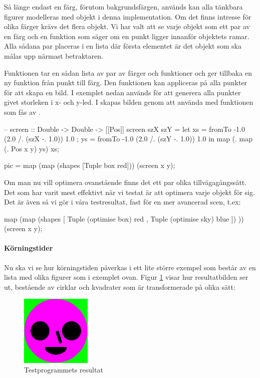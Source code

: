 \documentclass[Rapport]{subfiles}
\begin{document}
Så länge endast en färg, förutom bakgrundsfärgen, används kan alla tänkbara figurer modelleras
med objekt i denna implementation. Om det finns intresse för olika färger krävs det
flera objekt. Vi har valt att se varje objekt som ett par
av en färg och en funktion som säger om en punkt ligger innanför objektets ramar. 
Alla sådana par placeras i en lista där första elementet är det
objekt som ska målas upp närmast betraktaren. 

Funktionen  tar en sådan lista av par av färger och funktioner och 
ger tillbaka en ny funktion från punkt till färg. Den funktionen kan
appliceras på alla punkter för att skapa en bild. I exemplet nedan används 
för att generera alla punkter givet storleken i x- och y-led. I  skapas 
bilden genom att använda  med funktionen som fås av .

\begin{codeEx}

-- screen :: Double -> Double -> [[Pos]]
screen szX szY = let { xs = fromTo -1.0 (2.0 /. (szX -. 1.0)) 1.0
                     ; ys = fromTo -1.0 (2.0 /. (szY -. 1.0)) 1.0
                     }
                 in map (\x . map (\y . Pos x y) ys) xs;

pic = map (map (shapes [Tuple box red])) (screen x y);

\end{codeEx}

Om man nu vill optimera ovanstående finns det ett par olika tillvägagångssätt. 
Det som har varit mest effektivt när vi testat är att optimera varje objekt för sig. 
Det är även så vi gör i våra testresultat, fast för en mer avancerad scen, t.ex: 
\begin{codeEx}
map (map (shapes 
             [ Tuple (optimise box) red
             , Tuple (optimise sky) blue 
             ])
         )) (screen x y);
\end{codeEx}


\paragraph{Körningstider}

Nu ska vi se hur körningstiden påverkas i ett lite större exempel som består av
en lista med olika figurer som i exemplet ovan. Figur \ref{fig:Resultat:shapes:bild} visar hur
resultatbilden ser ut, bestående av cirklar och kvadrater som är transformerade på olika sätt:

\begin{figure}[H]
\centering
    \includegraphics[width=0.3\textwidth]{img/shapes.png}
    \caption{Testprogrammets resultat}
    \label{fig:Resultat:shapes:bild}
\end{figure}
\end{document}
